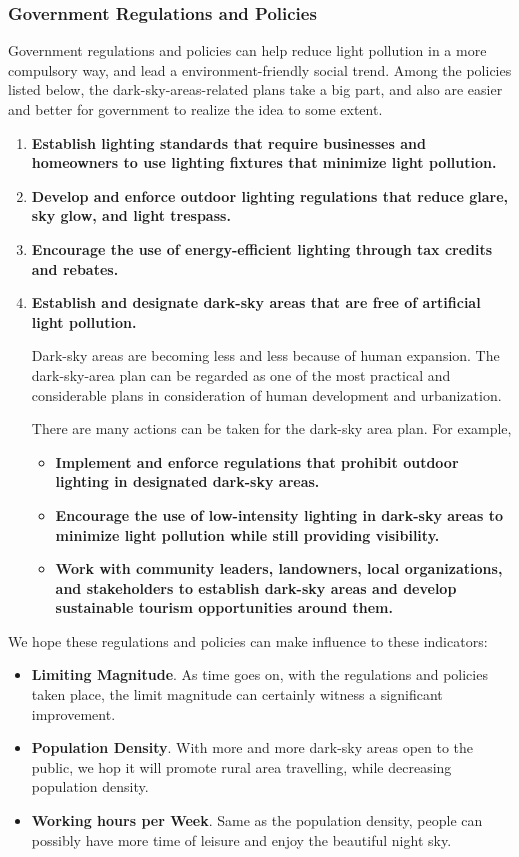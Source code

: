 \subsubsection{Government Regulations and Policies}
Government regulations and policies can help reduce light pollution in a more compulsory way, and lead a environment-friendly social trend. Among the policies listed below, the dark-sky-areas-related plans take a big part, and also are easier and better for government to realize the idea to some extent.
\begin{enumerate}
    \item \textbf{Establish lighting standards that require businesses and homeowners to use lighting fixtures that minimize light pollution.}
    
    \item \textbf{Develop and enforce outdoor lighting regulations that reduce glare, sky glow, and light trespass.}
    
    \item \textbf{Encourage the use of energy-efficient lighting through tax credits and rebates.}

    \item \textbf{Establish and designate dark-sky areas that are free of artificial light pollution.} 
    
    Dark-sky areas are becoming less and less because of human expansion. The dark-sky-area plan can be regarded as one of the most practical and considerable plans in consideration of human development and urbanization. 
    
    There are many actions can be taken for the dark-sky area plan. For example, 
    \begin{itemize}
        \item \textbf{Implement and enforce regulations that prohibit outdoor lighting in designated dark-sky areas.}
        \item \textbf{Encourage the use of low-intensity lighting in dark-sky areas to minimize light pollution while still providing visibility.}
        \item \textbf{Work with community leaders, landowners, local organizations, and stakeholders to establish dark-sky areas and develop sustainable tourism opportunities around them.}
    \end{itemize}
\end{enumerate}

We hope these regulations and policies can make influence to these indicators:
\begin{itemize}
    \item \textbf{Limiting Magnitude}. As time goes on, with the regulations and policies taken place, the limit magnitude can certainly witness a significant improvement.
    \item \textbf{Population Density}. With more and more dark-sky areas open to the public, we hop it will promote rural area travelling, while decreasing population density.
    \item \textbf{Working hours per Week}. Same as the population density, people can possibly have more time of leisure and enjoy the beautiful night sky.
\end{itemize}


